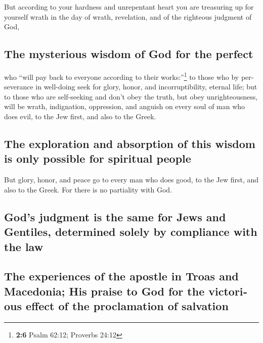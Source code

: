 \begin{paracol}{2}
\begin{otherlanguage}{english}
 But according to your hardness and unrepentant heart you
are treasuring up for yourself wrath in the day of wrath, revelation,
and of the righteous judgment of God,

\hypertarget{the-mysterious-wisdom-of-god-for-the-perfect}{%
\subsection{The mysterious wisdom of God for the
perfect}\label{the-mysterious-wisdom-of-god-for-the-perfect}}

 who ``will pay back to everyone according to their
works:''\footnote{\textbf{2:6} Psalm 62:12; Proverbs 24:12}
 to those who by perseverance in well-doing seek for
glory, honor, and incorruptibility, eternal life;  but to
those who are self-seeking and don't obey the truth, but obey
unrighteousness, will be wrath, indignation,  oppression,
and anguish on every soul of man who does evil, to the Jew first, and
also to the Greek.

\hypertarget{the-exploration-and-absorption-of-this-wisdom-is-only-possible-for-spiritual-people}{%
\subsection{The exploration and absorption of this wisdom is only
possible for spiritual
people}\label{the-exploration-and-absorption-of-this-wisdom-is-only-possible-for-spiritual-people}}

 But glory, honor, and peace go to every man who does
good, to the Jew first, and also to the Greek.  For there
is no partiality with God.

\hypertarget{gods-judgment-is-the-same-for-jews-and-gentiles-determined-solely-by-compliance-with-the-law}{%
\subsection{God's judgment is the same for Jews and Gentiles, determined
solely by compliance with the
law}\label{gods-judgment-is-the-same-for-jews-and-gentiles-determined-solely-by-compliance-with-the-law}}

\hypertarget{the-experiences-of-the-apostle-in-troas-and-macedonia-his-praise-to-god-for-the-victorious-effect-of-the-proclamation-of-salvation}{%
\subsection{The experiences of the apostle in Troas and Macedonia; His
praise to God for the victorious effect of the proclamation of
salvation}\label{the-experiences-of-the-apostle-in-troas-and-macedonia-his-praise-to-god-for-the-victorious-effect-of-the-proclamation-of-salvation}}


\end{otherlanguage}
\end{paracol}
